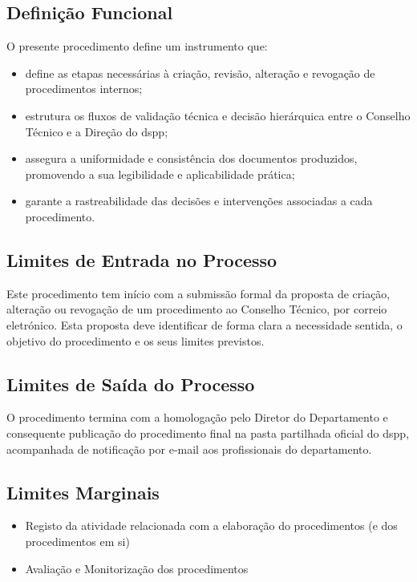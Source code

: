     \subsection{Definição Funcional}\label{subsec:definicao-funcional}

    O presente procedimento define um instrumento que:
    \begin{itemize}
        \item define as etapas necessárias à criação, revisão, alteração e revogação de procedimentos internos;
        \item estrutura os fluxos de validação técnica e decisão hierárquica entre o Conselho Técnico e a Direção do \gls{dspp};
        \item assegura a uniformidade e consistência dos documentos produzidos, promovendo a sua legibilidade e aplicabilidade prática;
        \item garante a rastreabilidade das decisões e intervenções associadas a cada procedimento.
    \end{itemize}
    
    \subsection{Limites de Entrada no Processo}\label{subsec:limites-de-entrada-no-processo}

    Este procedimento tem início com a submissão formal da proposta de criação, alteração ou revogação de um procedimento ao Conselho Técnico, por correio eletrónico. Esta proposta deve identificar de forma clara a necessidade sentida, o objetivo do procedimento e os seus limites previstos.

    \subsection{Limites de Saída do Processo}\label{subsec:limites-de-saida-do-processo}

    O procedimento termina com a homologação pelo Diretor do Departamento e consequente publicação do procedimento final na pasta partilhada oficial do \gls{dspp}, acompanhada de notificação por e-mail aos profissionais do departamento.

    \subsection{Limites Marginais}\label{subsec:limites-marginais}

    \begin{itemize}
        \item Registo da atividade relacionada com a elaboração do procedimentos (e dos procedimentos em si)
        \item Avaliação e Monitorização dos procedimentos
    \end{itemize}


